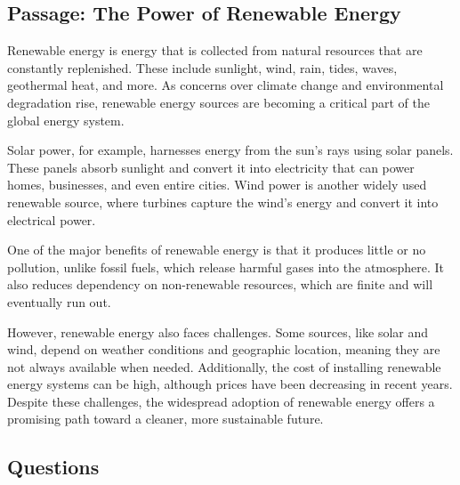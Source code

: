 \documentclass[12pt]{article}
\begin{document}
\onehalfspacing

\subsection*{Passage: The Power of Renewable Energy}

\begin{tcolorbox}[colframe=black!40, colback=gray!5]
\begin{spacing}{1.15}
    Renewable energy is energy that is collected from natural resources that are constantly replenished. These include sunlight, wind, rain, tides, waves, geothermal heat, and more. As concerns over climate change and environmental degradation rise, renewable energy sources are becoming a critical part of the global energy system.

    Solar power, for example, harnesses energy from the sun’s rays using solar panels. These panels absorb sunlight and convert it into electricity that can power homes, businesses, and even entire cities. Wind power is another widely used renewable source, where turbines capture the wind's energy and convert it into electrical power.

    One of the major benefits of renewable energy is that it produces little or no pollution, unlike fossil fuels, which release harmful gases into the atmosphere. It also reduces dependency on non-renewable resources, which are finite and will eventually run out.

    However, renewable energy also faces challenges. Some sources, like solar and wind, depend on weather conditions and geographic location, meaning they are not always available when needed. Additionally, the cost of installing renewable energy systems can be high, although prices have been decreasing in recent years. Despite these challenges, the widespread adoption of renewable energy offers a promising path toward a cleaner, more sustainable future.
\end{spacing}
\end{tcolorbox}

\subsection*{Questions}
\end{document}
